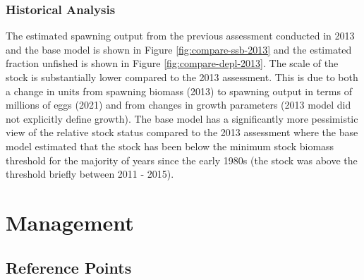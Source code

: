 \documentclass[11pt,
  english,
  a4paper,
]{article}
\begin{document}
\leavevmode\tagmcend\tagstructend\par


\hypertarget{historical-analysis}{%
\subsubsection{Historical Analysis}\label{historical-analysis}}

\leavevmode\tagmcend\tagstructend


The estimated spawning output from the previous assessment conducted in 2013 and the base model is shown in Figure \ref{fig:compare-ssb-2013} and the estimated fraction unfished is shown in Figure \ref{fig:compare-depl-2013}. The scale of the stock is substantially lower compared to the 2013 assessment. This is due to both a change in units from spawning biomass (2013) to spawning output in terms of millions of eggs (2021) and from changes in growth parameters (2013 model did not explicitly define growth). The base model has a significantly more pessimistic view of the relative stock status compared to the 2013 assessment where the base model estimated that the stock has been below the minimum stock biomass threshold for the majority of years since the early 1980s (the stock was above the threshold briefly between 2011 - 2015).

\leavevmode\tagmcend\tagstructend\par


\hypertarget{management}{%
\section{Management}\label{management}}

\leavevmode\tagmcend\tagstructend


\hypertarget{reference-points}{%
\subsection{Reference Points}\label{reference-points}}

\leavevmode\tagmcend\tagstructend

\end{document}
